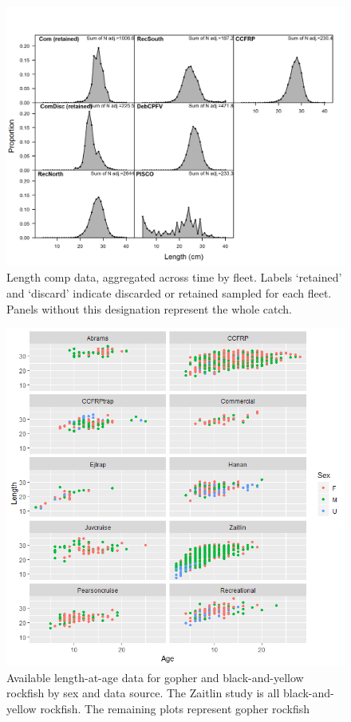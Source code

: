 \documentclass[12pt,]{article}
\begin{document}
\FloatBarrier

\begin{figure}
\centering
\includegraphics{r4ss/plots_mod1/comp_lendat__aggregated_across_time.png}
\caption{Length comp data, aggregated across time by fleet. Labels
`retained' and `discard' indicate discarded or retained sampled for each
fleet. Panels without this designation represent the whole catch.
\label{fig:comp_lendat_aggregated_across_time}}
\end{figure}

\begin{figure}
\centering
\includegraphics{Figures/Age_length_by_study}
\caption{Available length-at-age data for gopher and black-and-yellow
rockfish by sex and data source. The Zaitlin study is all
black-and-yellow rockfish. The remaining plots represent gopher rockfish
\label{fig:growth_samples}}
\end{figure}
\end{document}
